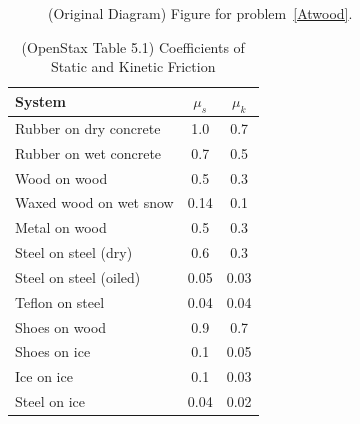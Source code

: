\documentclass[10pt,twocolumn]{exam}
\begin{document}
\begin{questions}

    \begin{figure}[h]
      \centering
      \caption{(Original Diagram) Figure for problem~\ref{Atwood}.}
    \end{figure}

\vs \pagebreak



  
  \begin{table}[h]
    \centering
    \begin{tabular}{lcc}
      \hline
      \textbf{System}        & $\mu_s$ & $\mu_k$ \\
      \hline
      Rubber on dry concrete   & 1.0   & 0.7   \\
      Rubber on wet concrete   & 0.7   & 0.5   \\
      Wood on wood             & 0.5   & 0.3   \\
      Waxed wood on wet snow   & 0.14  & 0.1   \\
      Metal on wood            & 0.5   & 0.3   \\
      Steel on steel (dry)     & 0.6   & 0.3   \\
      Steel on steel (oiled)   & 0.05  & 0.03  \\
      Teflon on steel          & 0.04  & 0.04  \\
      Shoes on wood            & 0.9   & 0.7   \\
      Shoes on ice             & 0.1   & 0.05  \\
      Ice on ice               & 0.1   & 0.03  \\
      Steel on ice             & 0.04  & 0.02  \\
      \hline\hline
    \end{tabular}
    \caption{(OpenStax Table 5.1) Coefficients of Static and Kinetic Friction}
  \end{table}


\end{questions}
\end{document}
